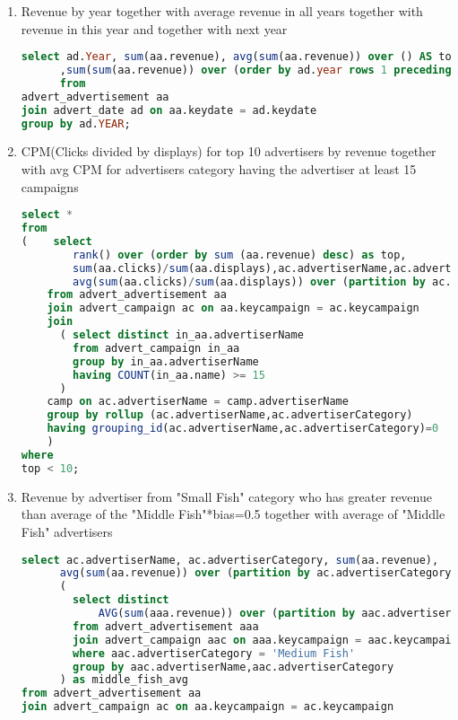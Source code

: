 \begin{enumerate}
\item    Revenue by year together with average revenue in all years together with revenue in this year and together with next year
  \begin{lstlisting}[language=sql] 
select ad.Year, sum(aa.revenue), avg(sum(aa.revenue)) over () AS total_avg 
      ,sum(sum(aa.revenue)) over (order by ad.year rows 1 preceding) AS sum_last_2_years
      from   
advert_advertisement aa
join advert_date ad on aa.keydate = ad.keydate
group by ad.YEAR;
  \end{lstlisting}
\item    CPM(Clicks divided by displays) for top 10 advertisers by revenue together with avg CPM for advertisers category having the advertiser at least 15 campaigns
  \begin{lstlisting}[language=sql] 
select *
from 
(    select
        rank() over (order by sum (aa.revenue) desc) as top,
        sum(aa.clicks)/sum(aa.displays),ac.advertiserName,ac.advertiserCategory as cat, 
        avg(sum(aa.clicks)/sum(aa.displays)) over (partition by ac.advertiserCategory)
    from advert_advertisement aa
    join advert_campaign ac on aa.keycampaign = ac.keycampaign
    join
      ( select distinct in_aa.advertiserName 
        from advert_campaign in_aa
        group by in_aa.advertiserName
        having COUNT(in_aa.name) >= 15
      )
    camp on ac.advertiserName = camp.advertiserName
    group by rollup (ac.advertiserName,ac.advertiserCategory) 
    having grouping_id(ac.advertiserName,ac.advertiserCategory)=0
    )
where 
top < 10;
\end{lstlisting}
\item Revenue by advertiser from "Small Fish" category who has greater revenue than average of the "Middle Fish"*bias=0.5 together with average of "Middle Fish" advertisers  
  \begin{lstlisting}[language=sql] 
select ac.advertiserName, ac.advertiserCategory, sum(aa.revenue), 
      avg(sum(aa.revenue)) over (partition by ac.advertiserCategory) as small_fish_avg,
      ( 
        select distinct
            AVG(sum(aaa.revenue)) over (partition by aac.advertiserCategory) as middle_fish_avg
        from advert_advertisement aaa 
        join advert_campaign aac on aaa.keycampaign = aac.keycampaign
        where aac.advertiserCategory = 'Medium Fish'   
        group by aac.advertiserName,aac.advertiserCategory
      ) as middle_fish_avg
from advert_advertisement aa
join advert_campaign ac on aa.keycampaign = ac.keycampaign

\end{lstlisting}
\end{enumerate}
